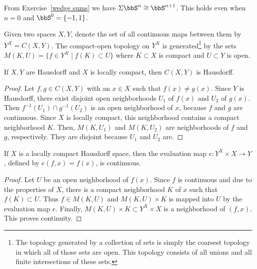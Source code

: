 \begin{example}
    From Exercise~\ref{wedge sums} we have $\Sigma \bbS^n\cong \bbS^{n+1}$. This holds even when $n=0$ and $\bbS^0=\{-1,1\}$.
\end{example}

\begin{defn}
    Given two spaces $X,Y$, denote the set of all continuous maps between them by $Y^X=C(X,Y)$. The compact-open topology on $Y^X$ is generated\footnote{The topology generated by a collection of sets is simply the coarsest topology in which all of those sets are open. This topology consists of all unions and all finite intersections of these sets.} by the sets $M(K,U)=\{f\in Y^X\mid f(K)\subset U\}$ where $K\subset X$ is compact and $U\subset Y$ is open.
\end{defn}

\begin{prop}
    If $X,Y$ are Hausdorff and $X$ is locally compact, then $C(X,Y)$ is Hausdorff.
\end{prop}
\begin{proof}
    Let $f,g\in C(X,Y)$ with an $x\in X$ such that $f(x)\neq g(x)$. Since $Y$ is Hausdorff, there exist disjoint open neighborhoods $U_1$ of $f(x)$ and $U_2$ of $g(x)$. Then $f^{-1}(U_1)\cap g^{-1}(U_2)$ is an open neighborhood of $x$, because $f$ and $g$ are continuous. Since $X$ is locally compact, this neighborhood contains a compact neighborhood $K$. Then, $M(K,U_1)$ and $M(K,U_2)$ are neighborhoods of $f$ and $g$, respectively. They are disjoint because $U_1$ and $U_2$ are.
\end{proof}

\begin{prop}
    If $X$ is a locally compact Hausdorff space, then the evaluation map $e:Y^X\times X\to Y$, defined by $e(f,x)=f(x)$, is continuous.
\end{prop}
\begin{proof}
    Let $U$ be an open neighborhood of $f(x)$. Since $f$ is continuous and due to the properties of $X$, there is a compact neighborhood $K$ of $x$ such that $f(K)\subset U$. Thus $f\in M(K,U)$ and $M(K,U)\times K$ is mapped into $U$ by the evaluation map $e$. Finally, $M(K,U)\times K \subset Y^X\times X$ is a neighborhood of $(f,x)$. This proves continuity.
\end{proof}


